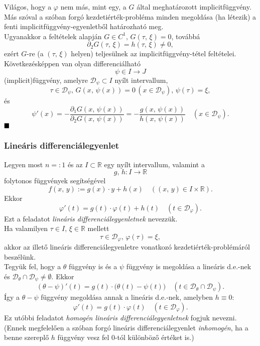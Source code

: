 \documentclass{article}
\newcommand{\R}{\mathbb{R}}
\newcommand{\Dp}{\mathcal{D}_\varphi}
\begin{document}
	Világos, hogy a $\varphi$ nem más, mint egy, a $G$ által meghatározott implicitfüggvény. Más szóval a szóban forgó kezdetiérték-probléma minden megoldása (ha létezik) a fenti implicitfüggvény-egyenletből határozható meg. \\
	
	Ugyanakkor a feltételek alapján $G \in C^1, \, G(\tau, \, \xi) = 0$, továbbá
	\[
		\partial_2 G(\tau, \, \xi) = h(\tau, \, \xi) \neq 0,
	\]
	ezért $G$-re (a $(\tau, \, \xi)$ helyen) teljesülnek az implicitfüggvény-tétel feltételei. Következésképpen van olyan differenciálható
	\[
		\psi \in I \to J
	\]
	(implicit)függvény, amelyre $\mathcal{D}_\psi \subset I$ nyílt intervallum,
	\[
		\tau \in \mathcal{D}_\psi, \, G(x, \, \psi(x)) = 0 \, (x \in \mathcal{D}_\psi), \, \psi(\tau) = \xi,
	\]
	és
	\[
		\psi'(x) = - \frac{\partial_1 G(x, \, \psi(x))}{\partial_2 G(x, \, \psi(x))} = - \frac{g(x, \, \psi(x))}{h(x, \, \psi(x))} \quad (x \in \mathcal{D}_\psi).
	\]
	$\hfill\blacksquare$
	
	
	
	
	\subsubsection{Lineáris differenciálegyenlet}
	Legyen most $n =: 1$ és az $I \subset \R$ egy nyílt intervallum, valamint a
	\[
		g, \, h : I \to \R
	\]
	folytonos függvények segítségével
	\[
		f(x, \, y) := g(x) \cdot y + h(x) \quad ((x, \, y) \in I \times \R).
	\]
	Ekkor
	\[
		\varphi'(t) = g(t) \cdot \varphi(t) + h(t) \quad (t \in \Dp).
	\]
	Ezt a feladatot \textit{lineáris differenciálegyenletnek} nevezzük. \\
	
	Ha valamilyen $\tau \in I, \, \xi \in \R$ mellett
	\[
		\tau \in \Dp, \, \varphi(\tau) = \xi,
	\]
	akkor az illető lineáris differenciálegyenletre vonatkozó kezdetiérték-problémáról beszélünk.\\
	
	Tegyük fel, hogy a $\theta$ függvény is és a $\psi$ függvény is megoldása a lineáris d.e.-nek és $\mathcal{D}_\theta \cap \mathcal{D}_\psi \neq \emptyset$. Ekkor
	\[
		(\theta - \psi)'(t) = g(t) \cdot \big( \theta(t) - \psi(t) \big) \quad (t \in \mathcal{D}_\theta \cap \mathcal{D}_\psi).
	\]
	Így a $\theta - \psi$ függvény megoldása annak a lineáris d.e.-nek, amelyben $h \equiv 0$:
	\[
		\varphi'(t) = g(t) \cdot \varphi(t) \quad (t \in \Dp).
	\]
	Ez utóbbi feladatot \textit{homogén lineáris differenciálegyenletnek} fogjuk nevezni. (Ennek megfelelően a szóban forgó lineáris differenciálegyenlet \textit{inhomogén}, ha a benne szereplő $h$ függvény vesz fel 0-tól különböző értéket is.)\\
	
\end{document}
